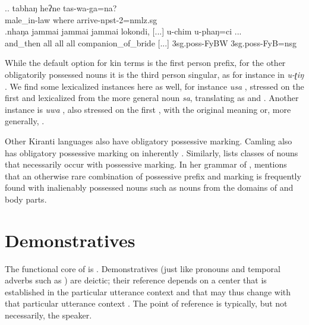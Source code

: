 \ex.\ag. tabhaŋ heʔne tas-wa-ga=na?\\
 	male\_in-law where arrive{\sc -npst-2=nmlz.sg}\\
\bg.nhaŋa   jammai jammai jammai lokondi,     [...] u-chim u-phaŋ=ci ... \\
and\_then all all all companion\_of\_bride [...] {\sc 3sg.poss-}FyBW {\sc 3sg.poss-}FyB{\sc =nsg}\\
 
	
While the default option for kin terms is the first person prefix, for the other obligatorily possessed nouns it is the third person singular, as for instance in \emph{u-ʈiŋ} . We find some lexicalized instances here as well, for instance \emph{usa} , stressed on the first  and lexicalized from the more general noun \emph{sa}, translating as  and . Another instance is \emph{uwa} , also stressed on the first , with the original meaning  or, more generally, . 

Other Kiranti languages also have obligatory possessive marking. Camling also has obligatory possessive marking on inherently  \citep[41]{Ebert1997Camling}. Similarly, \citet[98--100]{Doornenbal2009A-grammar} lists  classes of nouns that necessarily occur with possessive marking. In her grammar of , \citet[72]{Lahaussois2002Thulung} mentions that an otherwise rare combination of possessive prefix and  marking is frequently found with inalienably possessed nouns such as nouns from the domains of  and body parts.




\section{Demonstratives} \label{dem-pron}

The functional core of  is . Demonstratives (just like pronouns and temporal adverbs such as ) are deictic; their reference depends on a center that is established in the  particular utterance context and that may thus  change with that particular utterance context \citep{Buehler1934_Sprachtheorie, Fillmore1997_Deixis}. The point of reference is typically, but not necessarily, the speaker. 


